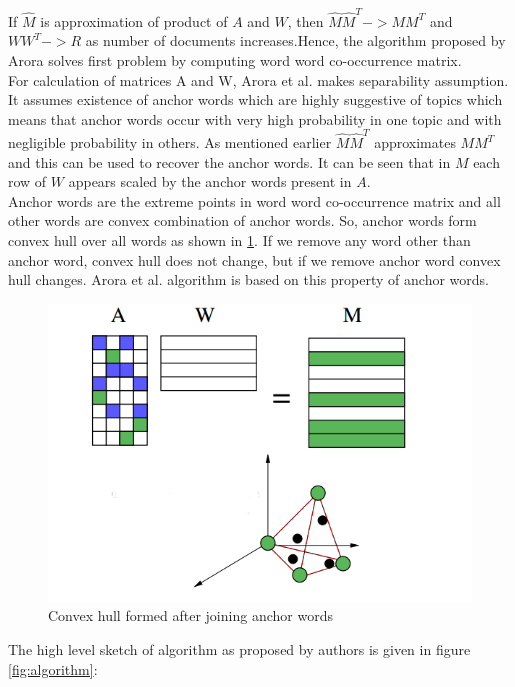 \documentclass[a4paper,11pt]{article}
\begin{document}
If $\hat{M}$  is approximation of product of $A$ and $W$, then $\hat{M} \hat{M}^T -> M M^T $ and $W W^T -> R$ as number of documents increases.Hence, the algorithm proposed by Arora solves first problem by computing word word co-occurrence matrix. \\

For calculation of matrices A and W, Arora et al. \cite{tm} makes separability assumption. It assumes existence of anchor words which are highly suggestive of topics which means that anchor words occur with very high probability in one topic and with negligible probability in others. As mentioned earlier $\hat{M} \hat{M}^T$ approximates $M M^T $ and this can be used to recover the anchor words. It can be seen that in $M$ each row of $W$ appears scaled by the anchor words present in $A$. \\

Anchor words are the extreme points in word word co-occurrence matrix and all other words are convex combination of anchor words. So, anchor words form convex hull over all words as shown in \ref{fig:convexhull}. If we remove any word other than anchor word, convex hull does not change, but if we remove anchor word convex hull changes. Arora et al. \cite{tm} algorithm is based on this property of anchor words. \\



\begin{figure}[htb]
\centering
\includegraphics[scale=0.4]{convexhull.png}
\caption{Convex hull formed after joining anchor words \cite{tm}}
\label{fig:convexhull}
\end{figure}
The high level sketch of algorithm as proposed by authors \cite{tm} is given in figure \ref{fig:algorithm}:
\end{document}
